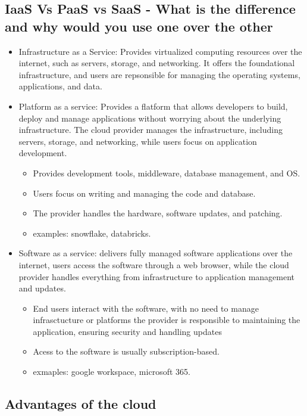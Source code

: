 \documentclass{report}
\begin{document}
\subsection{IaaS Vs PaaS vs SaaS - What is the difference and why would you use one over the other}
\begin{itemize}
    \item Infrastructure as a Service: Provides virtualized computing resources over the internet, such as servers, storage, and networking. It offers the foundational infrastructure, and users are repsonsible for managing the operating systems, applications, and data.
    \item Platform as a service: Provides a flatform that allows developers to build, deploy and manage applications without worrying about the underlying infrastructure. The cloud provider manages the infrastructure, including servers, storage, and networking, while users focus on application development.
        \begin{itemize}[label=$\circ$]
            \item Provides development tools, middleware, database management, and OS.
            \item Users focus on writing and managing the code and database.
            \item The provider handles the hardware, software updates, and patching.
            \item examples: snowflake, databricks.
        \end{itemize}

    \item Software as a service: delivers fully managed software applications over the internet, users access the software through a web browser, while the cloud provider handles everything from infrastructure to application management and updates.
        \begin{itemize}[label=$\circ$]
            \item End users interact with the software, with no need to manage infrasctucture or platforms
                \tiem the provider is responsible to maintaining the application, ensuring security and handling updates
            \item Acess to the software is usually subscription-based.
            \item exmaples: google workspace, microsoft 365.
        \end{itemize}
\end{itemize}
\subsection{Advantages of the cloud}
\end{document}
